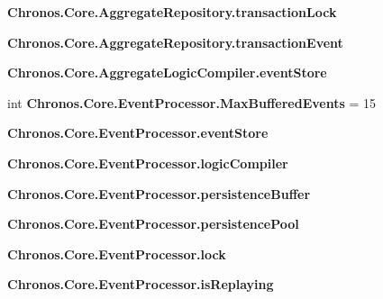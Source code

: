 \begin{DoxyCompactItemize}
\item 
{\bfseries Chronos.\+Core.\+Aggregate\+Repository.\+transaction\+Lock}\hypertarget{group__Chronos_ga10fe7ac1005027eb38f2ae84cac81a94}{}\label{group__Chronos_ga10fe7ac1005027eb38f2ae84cac81a94}

\item 
{\bfseries Chronos.\+Core.\+Aggregate\+Repository.\+transaction\+Event}\hypertarget{group__Chronos_gac445e890b4e170bde67192cb7b2261a7}{}\label{group__Chronos_gac445e890b4e170bde67192cb7b2261a7}

\item 
{\bfseries Chronos.\+Core.\+Aggregate\+Logic\+Compiler.\+event\+Store}\hypertarget{group__Chronos_gadee9e3710c8e3dc99a787835d9529433}{}\label{group__Chronos_gadee9e3710c8e3dc99a787835d9529433}

\item 
int {\bfseries Chronos.\+Core.\+Event\+Processor.\+Max\+Buffered\+Events} = 15\hypertarget{group__Chronos_ga1f30dfe37ad2fa3ae5f2ffffd6ad6348}{}\label{group__Chronos_ga1f30dfe37ad2fa3ae5f2ffffd6ad6348}

\item 
{\bfseries Chronos.\+Core.\+Event\+Processor.\+event\+Store}\hypertarget{group__Chronos_gaae8d192bcf1a13fbf6a676c8dfa2b5e9}{}\label{group__Chronos_gaae8d192bcf1a13fbf6a676c8dfa2b5e9}

\item 
{\bfseries Chronos.\+Core.\+Event\+Processor.\+logic\+Compiler}\hypertarget{group__Chronos_gac5e5c995b78cc5cca2902982559df43a}{}\label{group__Chronos_gac5e5c995b78cc5cca2902982559df43a}

\item 
{\bfseries Chronos.\+Core.\+Event\+Processor.\+persistence\+Buffer}\hypertarget{group__Chronos_ga11d67f6b485916158872ab21105aa549}{}\label{group__Chronos_ga11d67f6b485916158872ab21105aa549}

\item 
{\bfseries Chronos.\+Core.\+Event\+Processor.\+persistence\+Pool}\hypertarget{group__Chronos_ga4ee96effbd25d65dd0ba09e11bb8ef97}{}\label{group__Chronos_ga4ee96effbd25d65dd0ba09e11bb8ef97}

\item 
{\bfseries Chronos.\+Core.\+Event\+Processor.\+lock}\hypertarget{group__Chronos_ga5ed1822f9951eaad44aacb9b684779b3}{}\label{group__Chronos_ga5ed1822f9951eaad44aacb9b684779b3}

\item 
{\bfseries Chronos.\+Core.\+Event\+Processor.\+is\+Replaying}\hypertarget{group__Chronos_gaf157541e46bb967f119f0abf3662f9bc}{}\label{group__Chronos_gaf157541e46bb967f119f0abf3662f9bc}


\end{DoxyCompactItemize}
